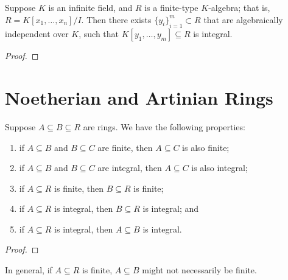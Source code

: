 \begin{theorem}
    Suppose \(K\) is an infinite field, and \(R\) is a finite-type \(K\)-algebra;
    that is, \(R = K[x_1,\hdots,x_n]/I\).
    Then there exists \({\{y_i\}}_{i=1}^m \subset R\) that are algebraically independent over \(K\),
    such that \(K[y_1,\hdots,y_m] \subseteq R\) is integral.
\end{theorem}
\begin{proof}
    
\end{proof}


\section{Noetherian and Artinian Rings}

\begin{proposition}
    Suppose \(A \subseteq B \subseteq R\) are rings.
    We have the following properties:
    \begin{enumerate}[label={(\alph*)}, itemsep=0mm]
        \item if \(A \subseteq B\) and \(B \subseteq C\) are finite, then \(A \subseteq C\) is also finite;
        \item if \(A \subseteq B\) and \(B \subseteq C\) are integral, then \(A \subseteq C\) is also integral;
        \item if \(A \subseteq R\) is finite, then \(B \subseteq R\) is finite;
        \item if \(A \subseteq R\) is integral, then \(B \subseteq R\) is integral; and
        \item if \(A \subseteq R\) is integral, then \(A \subseteq B\) is integral.
    \end{enumerate}
\end{proposition}
\begin{proof}
    
\end{proof}
\begin{remark}
    In general, if \(A \subseteq R\) is finite, \(A \subseteq B\) might not necessarily be finite.
\end{remark}

